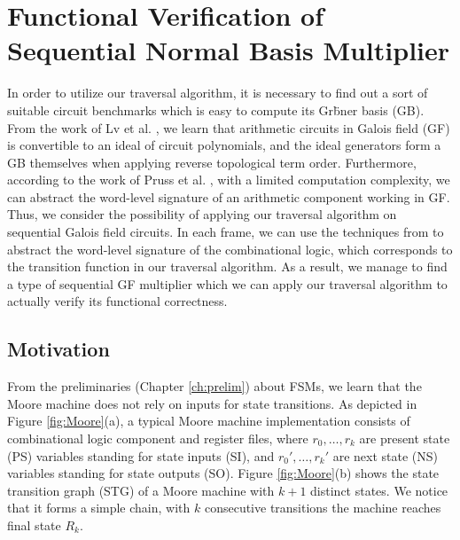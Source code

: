 \chapter{Functional Verification of Sequential Normal Basis Multiplier}
\label{ch:normal}
In order to utilize our traversal algorithm, it is necessary to find out
a sort of suitable circuit benchmarks which is easy to compute its
Gr\"bner basis (GB). From the work of Lv et al. \cite{lv_dissertation},
we learn that arithmetic circuits in Galois field (GF) is
convertible to an ideal of circuit polynomials, and the 
ideal generators form a GB themselves when applying reverse topological
term order. Furthermore, according to the work of Pruss et al.
\cite{tim_dissertation}, with a limited computation complexity,
we can abstract the word-level signature of an arithmetic 
component working in GF. Thus, we consider the possibility 
of applying our traversal algorithm on sequential Galois
field circuits. In each frame, we can use the techniques 
from \cite{tim_dissertation} to abstract the word-level
signature of the combinational logic, which corresponds
to the transition function in our traversal algorithm.
As a result, we manage to find a type of sequential GF multiplier
which we can apply our traversal algorithm to actually 
verify its functional correctness.

\section{Motivation}
\label{sec:normal_motiv}
From the preliminaries (Chapter \ref{ch:prelim}) about FSMs, we learn that the
Moore machine does not rely on inputs for state transitions. 
As depicted in Figure \ref{fig:Moore}(a), a typical Moore machine implementation
consists of combinational logic component and register files, where
$r_0,\dots,r_k$ are present state (PS) variables 
standing for state inputs (SI), and $r_0',\dots,r_k'$ are next state (NS) variables standing for
state outputs (SO). Figure \ref{fig:Moore}(b) shows the state transition graph (STG) of 
a Moore machine with $k+1$ distinct states. We notice that it forms a simple chain,
with $k$ consecutive transitions the machine reaches final state $R_k$.

\begin{figure}[H]
\end{figure}


